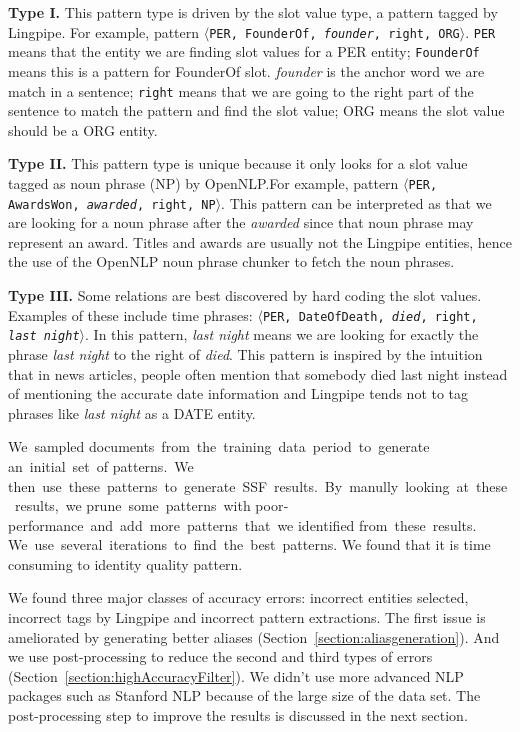 \textbf{Type I.} This pattern type is driven by the slot value type, a pattern
tagged by Lingpipe. For example, pattern
$\langle$\texttt{PER, FounderOf, \textit{founder}, right, ORG}$\rangle$. \texttt{PER} means 
that the entity we are finding slot values for a PER entity; \texttt{FounderOf} 
means this is a pattern for FounderOf slot. \textit{founder} is the anchor word we are 
match in a sentence; \texttt{right} means that we are going to the 
right part of the sentence to match the pattern and find the slot value; ORG 
means the slot value should be a ORG entity.

\textbf{Type II.} This pattern type is unique because it only looks for a
slot value tagged as noun phrase (NP) by OpenNLP.\@ For example,
pattern $\langle$\texttt{PER, AwardsWon, \textit{awarded}, 
right, NP}$\rangle$. This pattern can be interpreted 
as that we are looking for a noun phrase after the \textit{awarded} since that noun 
phrase may represent an award. Titles and awards are usually 
not the Lingpipe entities, hence the use of the OpenNLP noun phrase chunker to fetch the 
noun phrases.

\textbf{Type III.} Some relations are best discovered by hard coding the slot values.
Examples of these include time phrases: $\langle$\texttt{PER, DateOfDeath, \textit{died}, right, 
\textit{last night}}$\rangle$. In this pattern, \textit{last night} means we are looking for 
exactly the phrase \textit{last night} to the right of \textit{died}. This pattern is 
inspired by the intuition that in news articles, people often mention that 
somebody died last night instead of mentioning the accurate date information 
and Lingpipe tends not to tag phrases like \textit{last night} as a DATE entity. 

We sampled documents from the training data period to generate an initial set of
patterns. We then use these patterns to generate SSF results. By manully looking at these results, we
prune some patterns with poor­performance and add more patterns that we identified from these results.
We use several iterations to find the best patterns.
We found that it is time consuming to identity quality pattern.


We found three major classes of accuracy errors:
incorrect entities selected, incorrect tags by Lingpipe and incorrect pattern extractions.
The first issue is ameliorated by generating better aliases (Section~\ref{section:aliasgeneration}). And we use
post-processing to reduce the second and third types of errors (Section~\ref{section:highAccuracyFilter}).
We didn't use more advanced NLP packages such as Stanford NLP because of the large size of the data set.
The post-processing step to improve the results is discussed in the next section.

